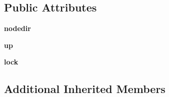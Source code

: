 \subsection*{Public Attributes}
\begin{DoxyCompactItemize}
\item 
\hypertarget{classcore_1_1phys_1_1pnodes_1_1_physical_node_ac05aa9498a9519cd7b391ad1accfa5a0}{{\bfseries nodedir}}\label{classcore_1_1phys_1_1pnodes_1_1_physical_node_ac05aa9498a9519cd7b391ad1accfa5a0}

\item 
\hypertarget{classcore_1_1phys_1_1pnodes_1_1_physical_node_a4c12f3b96d102ad02b340a59ef8b0868}{{\bfseries up}}\label{classcore_1_1phys_1_1pnodes_1_1_physical_node_a4c12f3b96d102ad02b340a59ef8b0868}

\item 
\hypertarget{classcore_1_1phys_1_1pnodes_1_1_physical_node_adb17f9a39843b36f6ecafa44bfa66056}{{\bfseries lock}}\label{classcore_1_1phys_1_1pnodes_1_1_physical_node_adb17f9a39843b36f6ecafa44bfa66056}

\end{DoxyCompactItemize}
\subsection*{Additional Inherited Members}


